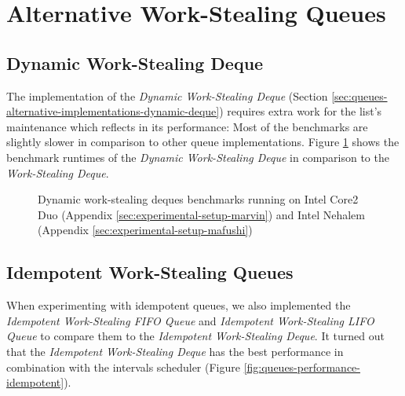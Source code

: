 \section{Alternative Work-Stealing Queues}
\label{sec:queues-performance-alternative}

\subsection{Dynamic Work-Stealing Deque}
\label{sec:queues-performance-alternative-dynamic}

The implementation of the \emph{Dynamic Work-Stealing Deque} (Section
\ref{sec:queues-alternative-implementations-dynamic-deque}) requires
extra work for the list's maintenance which reflects in its
performance: Most of the benchmarks are slightly slower in comparison
to other queue implementations. Figure
\ref{fig:queues-performance-dynamic} shows the benchmark runtimes of
the \emph{Dynamic Work-Stealing Deque} in comparison to the
\emph{Work-Stealing Deque}.


\begin{figure}[!htb]
  \centering
  \caption[Dynamic work-stealing deques benchmark results]{Dynamic
    work-stealing deques benchmarks running on Intel Core2 Duo
    (Appendix \ref{sec:experimental-setup-marvin}) and Intel Nehalem
    (Appendix \ref{sec:experimental-setup-mafushi})}
  \label{fig:queues-performance-dynamic}
\end{figure}

\subsection{Idempotent Work-Stealing Queues}
\label{sec:performance-alternative-idempotent}

When experimenting with idempotent queues, we also implemented the
\emph{Idempotent Work-Stealing FIFO Queue} and \emph{Idempotent
  Work-Stealing LIFO Queue} to compare them to the \emph{Idempotent
  Work-Stealing Deque}. It turned out that the \emph{Idempotent
  Work-Stealing Deque} has the best performance in combination with
the intervals scheduler (Figure
\ref{fig:queues-performance-idempotent}).

